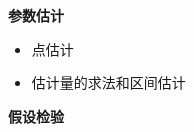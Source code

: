 \documentclass[10pt]{article}
\begin{document}
\begin{multicols}{2}
\begin{itemize}
\end{itemize}

\textbf{参数估计}
\begin{itemize}
\item 点估计

\item 估计量的求法和区间估计
\end{itemize}
\textbf{假设检验}

\end{multicols}
\end{document}
